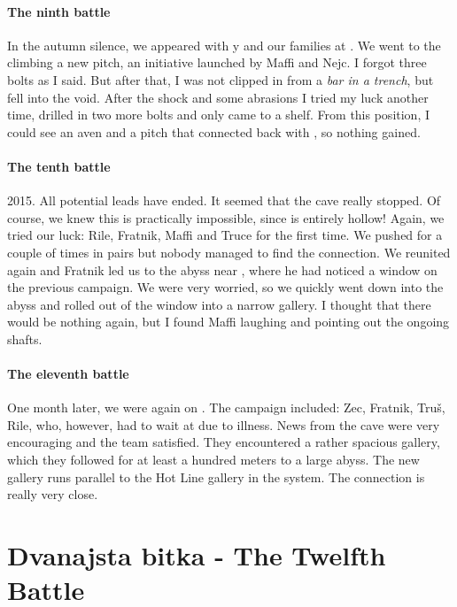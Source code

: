 \paragraph{The ninth battle} In the autumn silence, we appeared with y and our families at . We went to the  climbing a new pitch, an initiative launched by Maffi and Nejc. I forgot three bolts as I said. But after that, I was not clipped in from a \textit{bar in a trench}, but fell into the void. After the shock and some abrasions I tried my luck another time, drilled in two more bolts and only came to a shelf. From this position, I could see an aven and a pitch that connected back with , so nothing gained.

\paragraph {The tenth battle} 2015. All potential leads have ended. It seemed that the cave really stopped. Of course, we knew this is practically impossible, since  is entirely hollow! Again, we tried our luck: Rile, Fratnik, Maffi and Truce for the first time. We pushed for a couple of times in pairs but nobody managed to find the connection. We reunited again and Fratnik led us to the abyss near , where he had noticed a window on the previous campaign. We were very worried, so we quickly went down into the abyss and rolled out of the window into a narrow gallery. I thought that there would be nothing again, but I found Maffi laughing and pointing out the ongoing shafts.

\paragraph {The eleventh battle} One month later, we were again on . The campaign included: Zec, Fratnik, Truš, Rile, who, however, had to wait at  due to illness. News from the cave were very encouraging and the team satisfied. They encountered a rather spacious gallery, which they followed for at least a hundred meters to a large abyss. The new gallery runs parallel to the Hot Line gallery in the system. The connection is really very close.


\section{Dvanajsta bitka - The Twelfth Battle}

